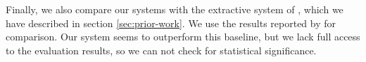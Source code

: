 \documentclass[a4paper,BCOR=10mm]{report}
\numberwithin{lemma}{chapter}
\numberwithin{definition}{chapter}
\begin{document}
Finally, we also compare our systems with the extractive system of \citet{chieu}, which we have described in section \ref{sec:prior-work}.
We use the results reported by \citet{markert} for comparison. Our system seems to outperform this baseline, but we lack full access to the evaluation results, so we can not check for statistical significance.

%
%
%
%
%
\end{document}
